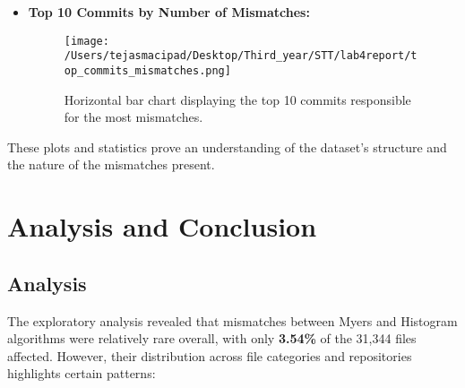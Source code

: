 \documentclass[12pt, a4paper]{report}
\begin{document}
\begin{enumerate}
\begin{itemize}
            \item \textbf{Top 10 Commits by Number of Mismatches:}  
            \begin{figure}[!h]
                \centering
                \texttt{[image: /Users/tejasmacipad/Desktop/Third\_year/STT/lab4report/top\_commits\_mismatches.png]}
                \caption{Horizontal bar chart displaying the top 10 commits responsible for the most mismatches.}
            \end{figure}
        \end{itemize}
\end{enumerate}
       
These plots and statistics prove an understanding of the dataset's structure and the nature of the mismatches present.

\newpage
\section{Analysis and Conclusion}

\subsection*{Analysis}
The exploratory analysis revealed that mismatches between Myers and Histogram algorithms were relatively rare overall, with only \textbf{3.54\%} of the 31,344 files affected. However, their distribution across file categories and repositories highlights certain patterns:
\end{document}
